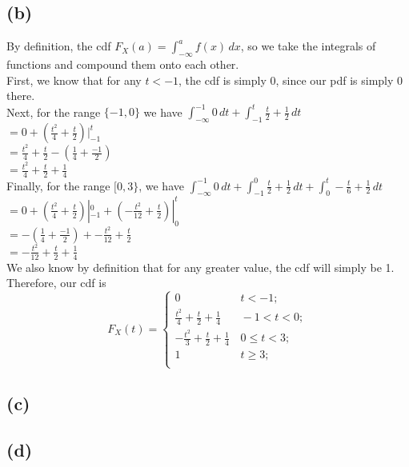 \documentclass{article}
\begin{document}
{\subsection*{(b)}
By definition, the cdf $F_X(a) = \int_{-\infty}^{a} f(x) \,dx$, so we take the integrals of functions and compound them onto each other. \\
First, we know that for any $t < -1$, the cdf is simply 0, since our pdf is simply 0 there. \\
Next, for the range $\{-1, 0\}$ we have $\int_{-\infty}^{-1} 0 \,dt + \int_{-1}^{t} \frac{t}{2} + \frac{1}{2} \,dt$ \\
$ = 0 + (\frac{t^2}{4} + \frac{t}{2}) |_{-1}^{t}$ \\ 
$ = \frac{t^2}{4} + \frac{t}{2} - (\frac{1}{4} + \frac{-1}{2})$ \\
$ = \frac{t^2}{4} + \frac{t}{2} + \frac{1}{4}$ \\ 
Finally, for the range $[0, 3\}$, we have $\int_{-\infty}^{-1} 0 \,dt + \int_{-1}^{0} \frac{t}{2}+ \frac{1}{2} \,dt + \int_{0}^{t} -\frac{t}{6} + \frac{1}{2} \,dt$ \\
$= 0 + (\frac{t^2}{4} + \frac{t}{2}) |_{-1}^{0} + (-\frac{t^2}{12} + \frac{t}{2}) |_{0}^{t}$ \\
$= -(\frac{1}{4} + \frac{-1}{2}) + -\frac{t^2}{12} + \frac{t}{2}$ \\
$=  -\frac{t^2}{12} + \frac{t}{2} + \frac{1}{4}$ \\
We also know by definition that for any greater value, the cdf will simply be 1. \\
Therefore, our cdf is 
\[
F_{X}\left(t\right)=\begin{cases}
0 & \,t<-1;\\
\frac{t^2}{4} + \frac{t}{2} + \frac{1}{4} & \,-1<t<0;\\
-\frac{t^2}{3} + \frac{t}{2} + \frac{1}{4} & \,0 \leq t < 3;\\
1 & \,t\geq 3;\\
\end{cases}
\]

\subsection*{(c)}


\subsection*{(d)}


}
\end{document}
